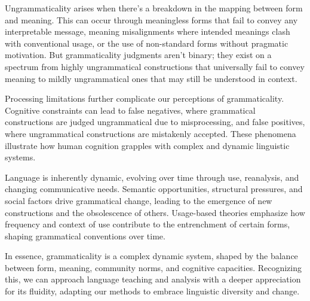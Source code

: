 Ungrammaticality arises when there's a breakdown in the mapping between form and meaning. This can occur through meaningless forms that fail to convey any interpretable message, meaning misalignments where intended meanings clash with conventional usage, or the use of non-standard forms without pragmatic motivation. But grammaticality judgments aren't binary; they exist on a spectrum from highly ungrammatical constructions that universally fail to convey meaning to mildly ungrammatical ones that may still be understood in context.

Processing limitations further complicate our perceptions of grammaticality. Cognitive constraints can lead to false negatives, where grammatical constructions are judged ungrammatical due to misprocessing, and false positives, where ungrammatical constructions are mistakenly accepted. These phenomena illustrate how human cognition grapples with complex and dynamic linguistic systems.

Language is inherently dynamic, evolving over time through use, reanalysis, and changing communicative needs. Semantic opportunities, structural pressures, and social factors drive grammatical change, leading to the emergence of new constructions and the obsolescence of others. Usage-based theories emphasize how frequency and context of use contribute to the entrenchment of certain forms, shaping grammatical conventions over time.

In essence, grammaticality is a complex dynamic system, shaped by the balance between form, meaning, community norms, and cognitive capacities. Recognizing this, we can approach language teaching and analysis with a deeper appreciation for its fluidity, adapting our methods to embrace linguistic diversity and change.
